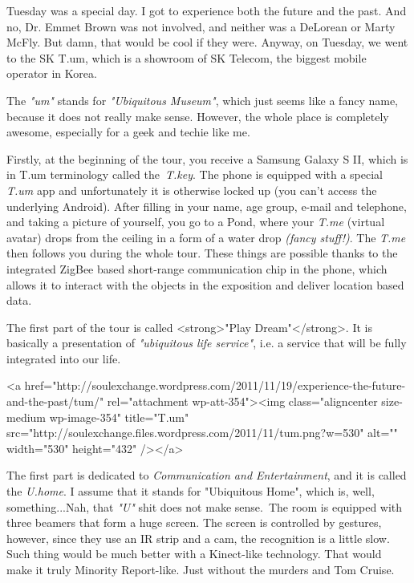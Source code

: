 \begin{post}
	\begin{content}
Tuesday was a special day. I got to experience both the future and the past. And no, Dr. Emmet Brown was not involved, and neither was a DeLorean or Marty McFly. But damn, that would be cool if they were. Anyway, on Tuesday, we went to the SK T.um, which is a showroom of SK Telecom, the biggest mobile operator in Korea.


The \textit{"um"} stands for \textit{"Ubiquitous Museum"}, which just seems like a fancy name, because it does not really make sense. However, the whole place is completely awesome, especially for a geek and techie like me.

Firstly, at the beginning of the tour, you receive a Samsung Galaxy S II, which is in T.um terminology called the \textit{T.key}. The phone is equipped with a special \textit{T.um} app and unfortunately it is otherwise locked up (you can't access the underlying Android). After filling in your name, age group, e-mail and telephone, and taking a picture of yourself, you go to a Pond, where your \textit{T.me} (virtual avatar) drops from the ceiling in a form of a water drop \textit{(fancy stuff!)}. The \textit{T.me} then follows you during the whole tour. These things are possible thanks to the integrated ZigBee based short-range communication chip in the phone, which allows it to interact with the objects in the exposition and deliver location based data.

The first part of the tour is called <strong>"Play Dream"</strong>. It is basically a presentation of \textit{"ubiquitous life service"}, i.e. a service that will be fully integrated into our life.

<a href="http://soulexchange.wordpress.com/2011/11/19/experience-the-future-and-the-past/tum/" rel="attachment wp-att-354"><img class="aligncenter size-medium wp-image-354" title="T.um" src="http://soulexchange.files.wordpress.com/2011/11/tum.png?w=530" alt="" width="530" height="432" /></a>

The first part is dedicated to \textit{Communication and Entertainment}, and it is called the \textit{U.home}. I assume that it stands for "Ubiquitous Home", which is, well, something...Nah, that \textit{"U"} shit does not make sense. The room is equipped with three beamers that form a huge screen. The screen is controlled by gestures, however, since they use an IR strip and a cam, the recognition is a little slow. Such thing would be much better with a Kinect-like technology. That would make it truly Minority Report-like. Just without the murders and Tom Cruise.


\end{content}
\end{post}
